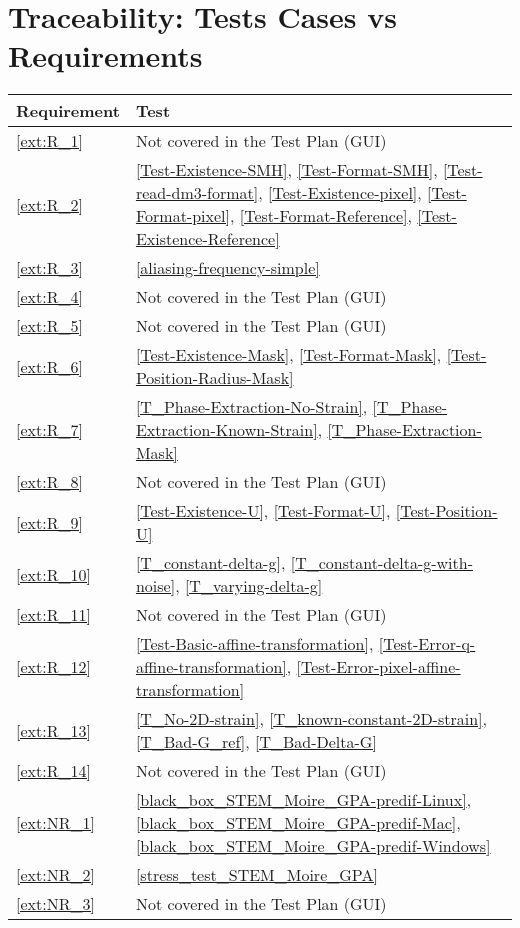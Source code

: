 \documentclass[12pt, titlepage]{article}
\begin{document}
\section{Traceability: Tests Cases vs Requirements}		

\noindent 
\begin{longtable}{l p{10cm}} 
\toprule
\textbf{Requirement} & \textbf{Test}\\
\midrule
\endhead
\cref{ext:R_1} & Not covered in the Test Plan (GUI)\\
\cref{ext:R_2} & \cref{Test-Existence-SMH}, \cref{Test-Format-SMH}, \cref{Test-read-dm3-format}, \cref{Test-Existence-pixel}, \cref{Test-Format-pixel}, \cref{Test-Format-Reference}, \cref{Test-Existence-Reference} \\
\cref{ext:R_3} & \cref{aliasing-frequency-simple}\\
\cref{ext:R_4} & Not covered in the Test Plan (GUI)\\
\cref{ext:R_5} & Not covered in the Test Plan (GUI)\\
\cref{ext:R_6} & \cref{Test-Existence-Mask}, \cref{Test-Format-Mask}, \cref{Test-Position-Radius-Mask}\\
\cref{ext:R_7} & \cref{T_Phase-Extraction-No-Strain}, \cref{T_Phase-Extraction-Known-Strain}, \cref{T_Phase-Extraction-Mask} \\
\cref{ext:R_8} & Not covered in the Test Plan (GUI)\\
\cref{ext:R_9} & \cref{Test-Existence-U}, \cref{Test-Format-U}, \cref{Test-Position-U} \\
\cref{ext:R_10} & \cref{T_constant-delta-g}, \cref{T_constant-delta-g-with-noise}, \cref{T_varying-delta-g}\\
\cref{ext:R_11} & Not covered in the Test Plan (GUI)\\
\cref{ext:R_12} & \cref{Test-Basic-affine-transformation}, \cref{Test-Error-q-affine-transformation}, \cref{Test-Error-pixel-affine-transformation} \\
\cref{ext:R_13} & \cref{T_No-2D-strain}, \cref{T_known-constant-2D-strain}, \cref{T_Bad-G_ref}, \cref{T_Bad-Delta-G}\\
\cref{ext:R_14} & Not covered in the Test Plan (GUI)\\
\cref{ext:NR_1} & \cref{black_box_STEM_Moire_GPA-predif-Linux}, \cref{black_box_STEM_Moire_GPA-predif-Mac}, \cref{black_box_STEM_Moire_GPA-predif-Windows}\\
\cref{ext:NR_2} & \cref{stress_test_STEM_Moire_GPA}\\
\cref{ext:NR_3} & Not covered in the Test Plan (GUI)\\

\end{longtable}
\end{document}
